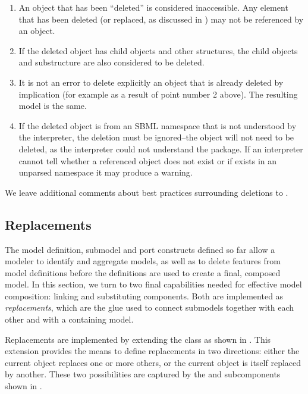 \begin{enumerate}

\item An object that has been ``deleted'' is considered inaccessible.
  Any element that has been deleted (or replaced, as discussed in
  ) may not be referenced by an \SBaseRef object.

\item If the deleted object has child objects and other structures, the
  child objects and substructure are also considered to be deleted.

\item It is not an error to delete explicitly an object that is already
  deleted by implication (for example as a result of point number 2
  above).  The resulting model is the same.

\item If the deleted object is from an SBML namespace that is not
  understood by the interpreter, the deletion must be ignored--the 
  object will not need to be deleted, as the interpreter could not
  understand the package.  If an interpreter cannot tell whether 
  a referenced object does not exist or if exists in an unparsed namespace
  it may produce a warning.

\end{enumerate}

We leave additional comments about best practices surrounding deletions
to .


\subsection{Replacements}
\label{replacements}
\label{extended-sbase-class}

The model definition, submodel and port constructs defined so far allow
a modeler to identify and aggregate models, as well as to delete
features from model definitions before the definitions are used to create a
final, composed model.  In this section, we turn to two final
capabilities needed for effective model composition: linking and
substituting components.  Both are implemented as \emph{replacements},
which are the glue used to connect submodels together with each other
and with a containing model.

Replacements are implemented by extending the \sbmlthreecore \SBase
class as shown in .  This extension provides the
means to define replacements in two directions: either the current
object replaces one or more others, or the current object is itself
replaced by another.  These two possibilities are captured by the
 and  subcomponents
shown in .

